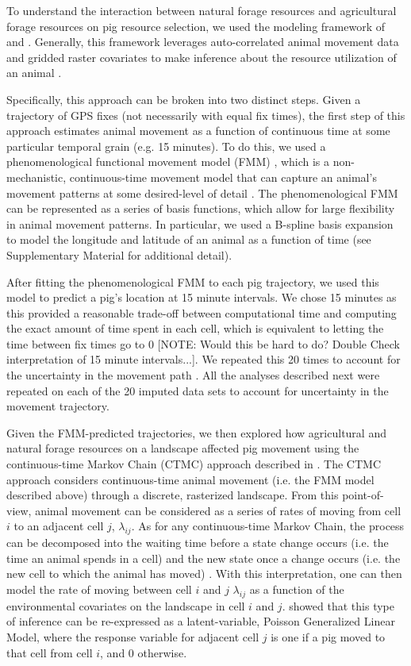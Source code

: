 \documentclass[a4paper]{article}
\begin{document}
To understand the interaction between natural forage resources and agricultural forage resources on pig resource selection, we used the modeling framework of \cite{Hanks2015} and \cite{Wilson2018}.  Generally, this framework leverages auto-correlated animal movement data and gridded raster covariates to make inference about the resource utilization of an animal \citep{Hanks2015,Buderman2018,Wilson2018}.  

Specifically, this approach can be broken into two distinct steps. Given a trajectory of GPS fixes (not necessarily with equal fix times), the first step of this approach estimates animal movement as a function of continuous time at some particular temporal grain (e.g. 15 minutes).  To do this, we used a phenomenological functional movement model (FMM) \citep{Buderman2016,Hooten2017a}, which is a non-mechanistic, continuous-time movement model that can capture an animal's movement patterns at some desired-level of detail \citep{Buderman2016}.  The phenomenological FMM can be represented as a series of basis functions, which allow for large flexibility in animal movement patterns.
In particular, we used a B-spline basis expansion to model the longitude and latitude of an animal as a function of time (see Supplementary Material for additional detail).

After fitting the phenomenological FMM to each pig trajectory, we used this model to predict a pig's location at 15 minute intervals. We chose 15 minutes as this provided a reasonable trade-off between computational time and computing the exact amount of time spent in each cell, which is equivalent to letting the time between fix times go to 0 [NOTE: Would this be hard to do? Double Check interpretation of 15 minute intervals...]. We repeated this 20 times to account for the uncertainty in the movement path \citep{Hanks2015,Buderman2018}.  All the analyses described next were repeated on each of the 20 imputed data sets to account for uncertainty in the movement trajectory.

Given the FMM-predicted trajectories, we then explored how agricultural and natural forage resources on a landscape affected pig movement using the continuous-time Markov Chain (CTMC) approach described in \cite{Hanks2015}. The CTMC approach considers continuous-time animal movement (i.e. the FMM model described above) through a discrete, rasterized landscape. From this point-of-view, animal movement can be considered as a series of rates of moving from cell $i$ to an adjacent cell $j$, $\lambda_{ij}$.  As for any continuous-time Markov Chain, the process can be decomposed into the waiting time before a state change occurs (i.e. the time an animal spends in a cell) and the new state once a change occurs (i.e. the new cell to which the animal has moved) \citep{Allen2003a}.  With this interpretation, one can then model the rate of moving between cell $i$ and $j$ $\lambda_{ij}$ as a function of the environmental covariates on the landscape in cell $i$ and $j$.  \cite{Hanks2015} showed that this type of inference can be re-expressed as a latent-variable, Poisson Generalized Linear Model, where the response variable for adjacent cell $j$ is one if a pig moved to that cell from cell $i$, and 0 otherwise.
\end{document}
